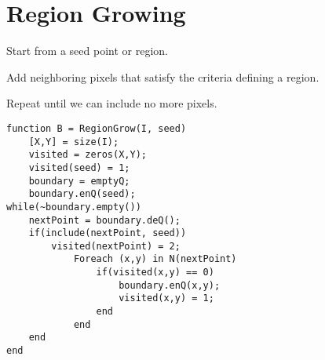 \section{Region Growing}
\begin{enumerate*}[label=\protect\circled{\arabic*},itemjoin=]
	\item Start from a seed point or region. \\
	\item Add neighboring pixels that satisfy the criteria defining a region. \\
	\item Repeat until we can include no more pixels.\\
\end{enumerate*}
\begin{lstlisting}
function B = RegionGrow(I, seed)
	[X,Y] = size(I);
	visited = zeros(X,Y);
	visited(seed) = 1;
	boundary = emptyQ;
	boundary.enQ(seed);
while(~boundary.empty())
	nextPoint = boundary.deQ();
	if(include(nextPoint, seed))
		visited(nextPoint) = 2;
			Foreach (x,y) in N(nextPoint)
				if(visited(x,y) == 0)
					boundary.enQ(x,y);
					visited(x,y) = 1;
				end
			end
	end
end
\end{lstlisting}
